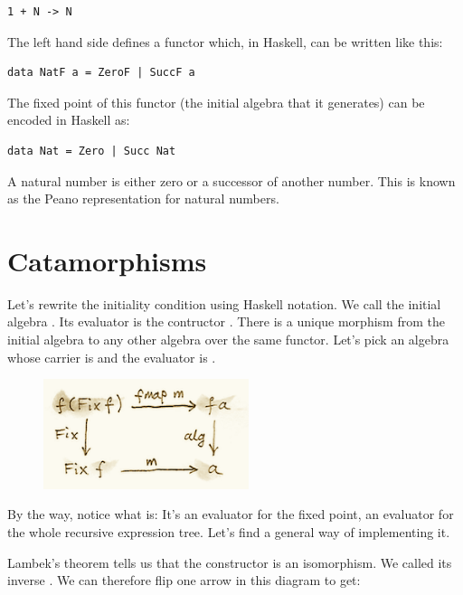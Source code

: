\begin{Verbatim}[commandchars=\\\{\}]
1 + N -> N
\end{Verbatim}
The left hand side defines a functor which, in Haskell, can be written
like this:

\begin{Verbatim}[commandchars=\\\{\}]
data NatF a = ZeroF | SuccF a
\end{Verbatim}
The fixed point of this functor (the initial algebra that it generates)
can be encoded in Haskell as:

\begin{Verbatim}[commandchars=\\\{\}]
data Nat = Zero | Succ Nat
\end{Verbatim}
A natural number is either zero or a successor of another number. This
is known as the Peano representation for natural numbers.

\section{Catamorphisms}\label{catamorphisms}

Let's rewrite the initiality condition using Haskell notation. We call
the initial algebra . Its evaluator is the contructor
. There is a unique morphism  from the initial
algebra to any other algebra over the same functor. Let's pick an
algebra whose carrier is  and the evaluator is .

\begin{figure}[H]
\centering
\includegraphics[width=60mm]{images/alg5.png}
\end{figure}

\noindent
By the way, notice what  is: It's an evaluator for the fixed
point, an evaluator for the whole recursive expression tree. Let's find
a general way of implementing it.

Lambek's theorem tells us that the constructor  is an
isomorphism. We called its inverse . We can therefore flip
one arrow in this diagram to get:

